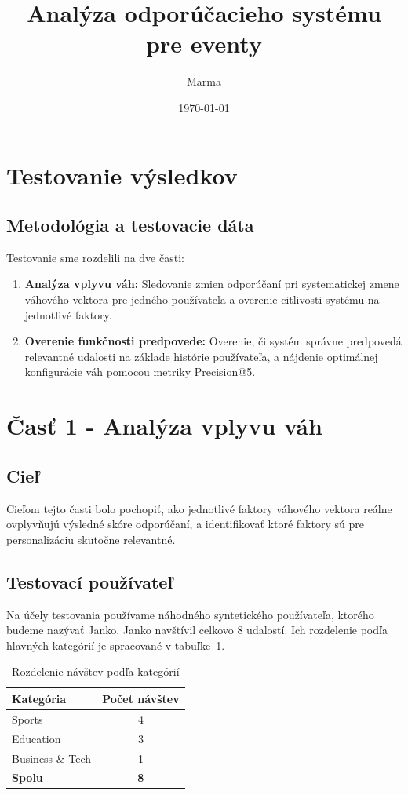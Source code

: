 \documentclass[12pt,a4paper]{article}
\title{Analýza odporúčacieho systému pre eventy}
\author{Marma}
\date{\today}
\begin{document}
\section{Testovanie výsledkov}

\subsection{Metodológia a testovacie dáta}

Testovanie sme rozdelili na dve časti:
\begin{enumerate}
    \item \textbf{Analýza vplyvu váh:} Sledovanie zmien odporúčaní pri systematickej
    zmene váhového vektora pre jedného používateľa a overenie citlivosti systému
    na jednotlivé faktory.
    \item \textbf{Overenie funkčnosti predpovede:} Overenie, či systém správne
    predpovedá relevantné udalosti na základe histórie používateľa, a nájdenie
    optimálnej konfigurácie váh pomocou metriky Precision@5.
\end{enumerate}

\section{Časť 1 - Analýza vplyvu váh}

\subsection{Cieľ}

Cieľom tejto časti bolo pochopiť, ako jednotlivé faktory váhového vektora reálne
ovplyvňujú výsledné skóre odporúčaní, a identifikovať ktoré faktory sú pre
personalizáciu skutočne relevantné.

\subsection{Testovací používateľ}

Na účely testovania používame náhodného syntetického používateľa, ktorého budeme
nazývať Janko. Janko navštívil celkovo 8 udalostí. Ich rozdelenie podľa hlavných
kategórií je spracované v tabuľke~\ref{tab:rozdelenie_kat}.

\begin{table}[H]
\centering
\caption{Rozdelenie návštev podľa kategórií}
\label{tab:rozdelenie_kat}
\begin{tabular}{|l|c|}
\hline
\textbf{Kategória} & \textbf{Počet návštev} \\ \hline
Sports           & 4 \\
Education        & 3 \\
Business \& Tech & 1 \\ \hline
\textbf{Spolu}   & \textbf{8} \\ \hline
\end{tabular}
\end{table}
\end{document}
